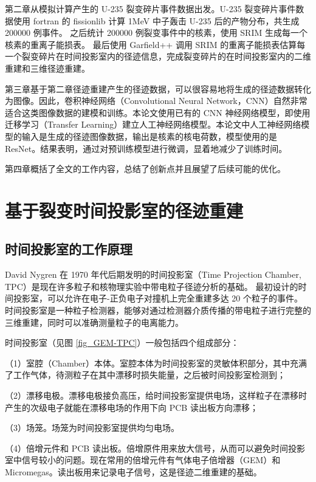 \documentclass[AutoFakeBold]{LZUThesis}
\begin{document}
第二章从模拟计算产生的 U-235 裂变碎片事件数据出发。U-235 裂变碎片事件数据使用 fortran 的 fissionlib 计算 1MeV 中子轰击 U-235 后的产物分布，共生成 200000 例事件。
之后统计 200000 例裂变事件中的核素，使用 SRIM 生成每一个核素的重离子能损表。
最后使用 Garfield++ 调用 SRIM 的重离子能损表估算每一个裂变碎片在时间投影室内的径迹信息，完成裂变碎片的在时间投影室内的二维重建和三维径迹重建。

第三章基于第二章径迹重建产生的径迹数据，可以很容易地将生成的径迹数据转化为图像。因此，卷积神经网络（Convolutional Neural Network，CNN）自然非常适合这类图像数据的建模和训练。本论文使用已有的 CNN 神经网络模型，即使用迁移学习（Transfer Learning）建立人工神经网络模型。本论文中人工神经网络模型的输入是生成的径迹图像数据，输出是核素的核电荷数，模型使用的是 ResNet。结果表明，通过对预训练模型进行微调，显着地减少了训练时间。

第四章概括了全文的工作内容，总结了创新点并且展望了后续可能的优化。









\chapter{基于裂变时间投影室的径迹重建}
\section{时间投影室的工作原理}
David Nygren 在 1970 年代后期发明的时间投影室（Time Projection Chamber, TPC）是现在许多粒子和核物理实验中带电粒子径迹分析的基础\cite{nygren1978time}。
最初设计的时间投影室，可以允许在电子-正负电子对撞机上完全重建多达 20 个粒子的事件。
时间投影室是一种粒子检测器，能够对通过检测器介质传播的带电粒子进行完整的三维重建，同时可以准确测量粒子的电离能力。

时间投影室（见图 \ref{fig_GEM-TPC}）一般包括四个组成部分\cite{闫洋洋2018用于高精度裂变截面测量的时间投影室, 魏康2019基于GEM工艺的裂变时间投影室中裂变碎片的讨论}：

（1）室腔（Chamber）本体。室腔本体为时间投影室的灵敏体积部分，其中充满了工作气体，待测粒子在其中漂移时损失能量，之后被时间投影室检测到；

（2）漂移电极。漂移电极接负高压，给时间投影室提供电场，这样粒子在漂移时产生的次级电子就能在漂移电场的作用下向 PCB 读出板方向漂移；

（3）场笼。场笼为时间投影室提供均匀电场。

（4）倍增元件和 PCB 读出板。倍增原件用来放大信号，从而可以避免时间投影室中信号较小的问题。现在常用的倍增元件有气体电子倍增器（GEM）和 Micromegas。读出板用来记录电子信号，这是径迹二维重建的基础。
\end{document}
